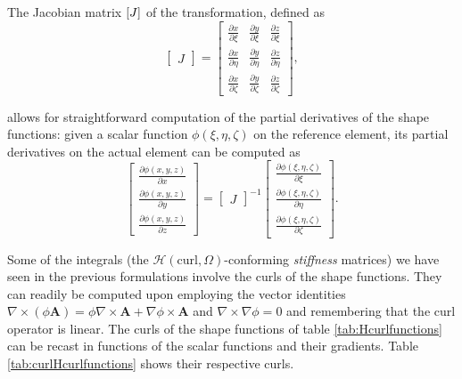 \noindent The Jacobian matrix $\left[J\right]$ of the transformation, defined as
\begin{equation}
\label{eq:jacobian}
\begin{bmatrix}
J
\end{bmatrix}
=
\begin{bmatrix}
\frac{\partial x}{\partial \xi} & \frac{\partial y}{\partial \xi} & \frac{\partial z}{\partial \xi}\\
\frac{\partial x}{\partial \eta} & \frac{\partial y}{\partial \eta} & \frac{\partial z}{\partial \eta}\\
\frac{\partial x}{\partial \zeta} & \frac{\partial y}{\partial \zeta} & \frac{\partial z}{\partial \zeta}
\end{bmatrix},
\end{equation}

\noindent allows for straightforward computation of the partial derivatives of the shape functions: given a scalar function $\phi(\xi, \eta, \zeta)$ on the reference element, its partial derivatives on the actual element can be computed as
\begin{equation}
\label{eq:gradients}
\begin{bmatrix}
\frac{\partial \phi(x, y, z)}{\partial x} \\
\frac{\partial \phi(x, y, z)}{\partial y} \\
\frac{\partial \phi(x, y, z)}{\partial z} 
\end{bmatrix}
=
\begin{bmatrix}
J
\end{bmatrix}^{-1}
\begin{bmatrix}
\frac{\partial \phi(\xi, \eta, \zeta)}{\partial \xi} \\
\frac{\partial \phi(\xi, \eta, \zeta)}{\partial \eta} \\
\frac{\partial \phi(\xi, \eta, \zeta)}{\partial \zeta} 
\end{bmatrix}.
\end{equation}

\noindent Some of the integrals (the $\mathcal{H}(\mathrm{curl},\Omega)$-conforming \textit{stiffness} matrices) we have seen in the previous formulations involve the curls of the shape functions. They can readily be computed upon employing the vector identities $\nabla \times \left( \phi \mathbf{A} \right) = \phi \nabla \times \mathbf{A} + \nabla \phi \times \mathbf{A}$ and $\nabla \times \nabla \phi = 0$ and remembering that the curl operator is linear. The curls of the shape functions of table \ref{tab:Hcurlfunctions} can be recast in functions of the scalar functions and their gradients. Table \ref{tab:curlHcurlfunctions} shows their respective curls.

